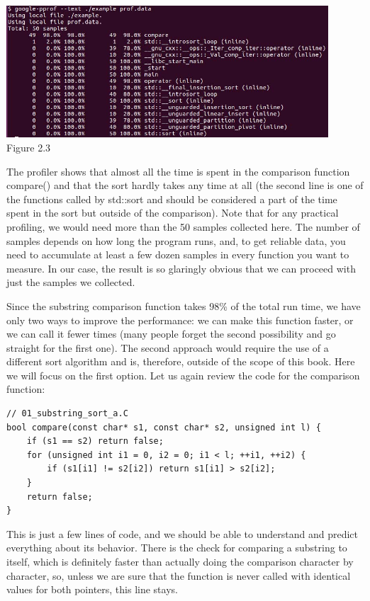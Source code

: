 \hspace*{\fill} \\ %
\begin{center}
\includegraphics[width=0.9\textwidth]{content/1/chapter2/images/3.jpg}\\
Figure 2.3
\end{center}

The profiler shows that almost all the time is spent in the comparison function compare() and that the sort hardly takes any time at all (the second line is one of the functions called by std::sort and should be considered a part of the time spent in the sort but outside of the comparison). Note that for any practical profiling, we would need more than the 50 samples collected here. The number of samples depends on how long the program runs, and, to get reliable data, you need to accumulate at least a few dozen samples in every function you want to measure. In our case, the result is so glaringly obvious that we can proceed with just the samples we collected.

Since the substring comparison function takes 98\% of the total run time, we have only two ways to improve the performance: we can make this function faster, or we can call it fewer times (many people forget the second possibility and go straight for the first one). The second approach would require the use of a different sort algorithm and is, therefore, outside of the scope of this book. Here we will focus on the first option. Let us again review the code for the comparison function:

\begin{lstlisting}[style=styleCXX]
// 01_substring_sort_a.C
bool compare(const char* s1, const char* s2, unsigned int l) {
	if (s1 == s2) return false;
	for (unsigned int i1 = 0, i2 = 0; i1 < l; ++i1, ++i2) {
		if (s1[i1] != s2[i2]) return s1[i1] > s2[i2];
	}
	return false;
}
\end{lstlisting}

This is just a few lines of code, and we should be able to understand and predict everything about its behavior. There is the check for comparing a substring to itself, which is definitely faster than actually doing the comparison character by character, so, unless we are sure that the function is never called with identical values for both pointers, this line stays.

